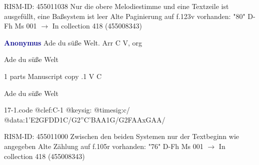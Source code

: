 \documentclass[twocolumn]{book}
\begin{document}
\newline RISM-ID: 455011038
\newline Nur die obere Melodiestimme und eine Textzeile ist ausgefüllt, eine Baßsystem ist leer
\newline Alte Paginierung auf f.123v vorhanden: "80"
\newline D-Fh  Ms 001
\newline $\rightarrow$ In collection 418 (455008343)

\newline \par \vspace{7pt} \textcolor{darkblue}{\textbf{Anonymus  }}
\newline Ade du süße Welt. Arr  C  
\newline V, org
\newline \begin{itshape} Ade du süße Welt\end{itshape} 
\newline \textcolor{darkblue}{}  1 parts  
\newline Manuscript copy
.1  V  C
\newline \begin{footnotesize} Ade du süße Welt \end{footnotesize}  
\begin{filecontents*}{17-1.code}
@clef:C-1
@keysig:
@timesig:c/
@data:1'E2GFDD1C/G2''C'BAA1G/G2FAAxGAA/
\end{filecontents*}
\newline
%

\newline RISM-ID: 455011000
\newline Zwischen den beiden Systemen nur der Textbeginn wie angegeben
\newline Alte Zählung auf f.105r vorhanden: "76"
\newline D-Fh  Ms 001
\newline $\rightarrow$ In collection 418 (455008343)
\end{document}
